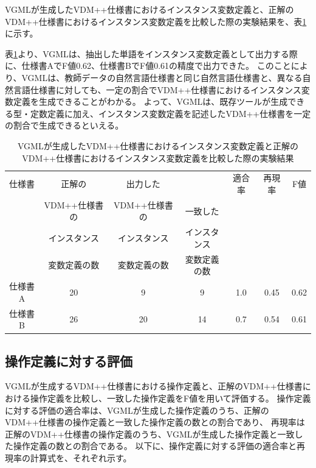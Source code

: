 VGMLが生成したVDM++仕様書におけるインスタンス変数定義と、正解のVDM++仕様書におけるインスタンス変数定義を比較した際の実験結果を、表\ref{table:instanceResult}に示す。

表\ref{table:instanceResult}より、VGMLは、抽出した単語をインスタンス変数定義として出力する際に、仕様書AでF値0.62、仕様書BでF値0.61の精度で出力できた。
このことにより、VGMLは、教師データの自然言語仕様書と同じ自然言語仕様書と、異なる自然言語仕様書に対しても、一定の割合でVDM++仕様書におけるインスタンス変数定義を生成できることがわかる。
よって、VGMLは、既存ツールが生成できる型・定数定義に加え、インスタンス変数定義を記述したVDM++仕様書を一定の割合で生成できるといえる。

\begin{table}[t]
	\caption{VGMLが生成したVDM++仕様書におけるインスタンス変数定義と正解のVDM++仕様書におけるインスタンス変数定義を比較した際の実験結果}
	\label{table:instanceResult}
	\begin{center}
        \begin{tabular}{c|c|c|c|c|c|c}
            \hline
            仕様書  & 正解の & 出力した &  & 適合率 & 再現率 & F値  \\
                    & VDM++仕様書の & VDM++仕様書の & 一致した  &        &       &      \\
                    & インスタンス & インスタンス & インスタンス  &        &       &      \\
                    & 変数定義の数 & 変数定義の数 & 変数定義の数  &        &       &      \\
            \hline
            仕様書A & 20                             & 9                 & 9                  & 1.0   & 0.45    & 0.62  \\
            \hline
            仕様書B & 26                             & 20                  & 14                  & 0.7   & 0.54   & 0.61 \\
            \hline
        \end{tabular}
    \end{center}
\end{table}

\subsection{操作定義に対する評価}
VGMLが生成するVDM++仕様書における操作定義と、正解のVDM++仕様書における操作定義を比較し、一致した操作定義をF値を用いて評価する。
操作定義に対する評価の適合率は、VGMLが生成した操作定義のうち、正解のVDM++仕様書の操作定義と一致した操作定義の数との割合であり、
再現率は正解のVDM++仕様書の操作定義のうち、VGMLが生成した操作定義と一致した操作定義の数との割合である。
以下に、操作定義に対する評価の適合率と再現率の計算式を、それぞれ示す。

